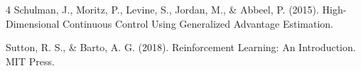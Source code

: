 \documentclass[12pt,twoside]{article}
\begin{document}
\begin{thebibliography}{4}
Schulman, J., Moritz, P., Levine, S., Jordan, M., & Abbeel, P. (2015). High-Dimensional Continuous Control Using Generalized Advantage Estimation.

Sutton, R. S., & Barto, A. G. (2018). Reinforcement Learning: An Introduction. MIT Press.















\end{thebibliography}
\end{document}
